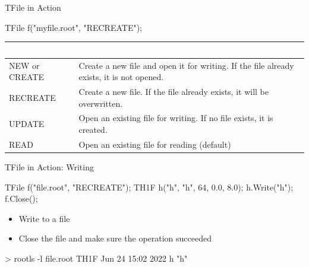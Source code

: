 \documentclass[aspectratio=169]{beamer}
\begin{document}
\begin{frame}[fragile]{TFile in Action}

\begin{myterminal}
TFile f("myfile.root", "RECREATE");
\end{myterminal}

\begin{center}
    \begin{tabular}{ |l|p{6.5cm}| }
 \hline
        \rowcolor{myblue} \textbf{\textcolor{white}{Option}} & \textbf{\textcolor{white}{Description}} \\
 \hline
 NEW or CREATE & Create a new file and open it for writing. If the file already exists, it is not opened. \\
 \hline
 RECREATE & Create a new file. If the file already exists, it will be overwritten. \\
 \hline
 UPDATE & Open an existing file for writing. If no file exists, it is created. \\
 \hline
    READ & Open an existing file for reading (default) \\
 \hline
\end{tabular}
\end{center}
\end{frame}

\begin{frame}[fragile]{TFile in Action: Writing}

\begin{myterminal}
TFile f("file.root", "RECREATE");
TH1F h("h", "h", 64, 0.0, 8.0);
h.Write("h");
f.Close();
\end{myterminal}

\begin{itemize}
    \item Write to a file
    \item Close the file and make sure the operation succeeded
\end{itemize}

\begin{myterminal}
> rootls -l file.root
TH1F  Jun 24 15:02 2022 h  "h"
\end{myterminal}

\end{frame}
\end{document}
